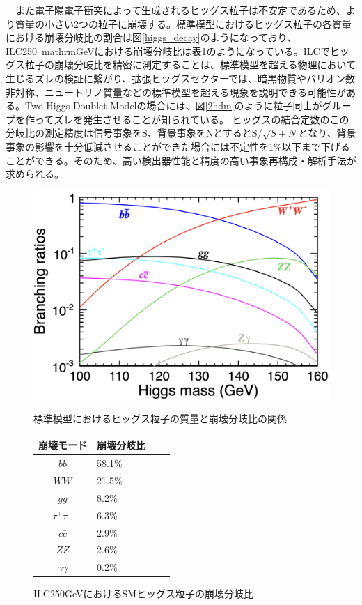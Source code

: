 　また電子陽電子衝突によって生成されるヒッグス粒子は不安定であるため、より質量の小さい2つの粒子に崩壊する。標準模型におけるヒッグス粒子の各質量における崩壊分岐比の割合は図\ref{higgs_decay}のようになっており、ILC250\ mathrm{GeV}における崩壊分岐比は表\ref{HiggsDecayonILC}のようになっている。ILCでヒッグス粒子の崩壊分岐比を精密に測定することは、標準模型を超える物理において生じるズレの検証に繋がり、拡張ヒッグスセクターでは、暗黒物質やバリオン数非対称、ニュートリノ質量などの標準模型を超える現象を説明できる可能性がある。Two-Higgs Doublet Modelの場合には、図\ref{2hdm}のように粒子同士がグループを作ってズレを発生させることが知られている。
ヒッグスの結合定数のこの分岐比の測定精度は信号事象をS、背景事象をNとするとS/$\sqrt{S+N}$となり、背景事象の影響を十分低減させることができた場合には不定性を1\%以下まで下げることができる。そのため、高い検出器性能と精度の高い事象再構成・解析手法が求められる。\\
\begin{figure}[H]
 \begin{minipage}[h]{.45\linewidth}
	\begin{center}
 \includegraphics[keepaspectratio, scale=0.2]
 	{Figure/Introduction/higgs_decay.png}
 		\caption{標準模型におけるヒッグス粒子の質量と崩壊分岐比の関係}
 		\label{higgs_decay}
	\end{center}
 \end{minipage}
 \hfill
\begin{minipage}[h]{.45\linewidth}
\def\@captype{table}
 \centering
  \begin{tabular}{clll}
   \hline
   崩壊モード & 崩壊分岐比\\
   \hline \hline
   $b\bar{b}$ & 58.1\%\\
   $WW$ & 21.5\%\\
   $gg$ & 8.2\%\\
   ${\tau}^+ {\tau}^-$ & 6.3\%\\
   $c \bar{c}$ & 2.9\%\\
   $ZZ$ & 2.6\%\\
   $\gamma \gamma$ & 0.2\%\\
   \hline
  \end{tabular}
   \caption{ILC250GeVにおけるSMヒッグス粒子の崩壊分岐比}
   \label{HiggsDecayonILC}
 \end{minipage}
 \end{figure}
